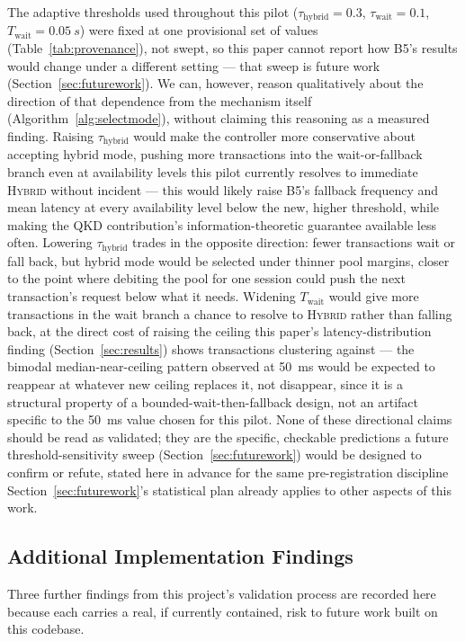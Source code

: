 \documentclass[journal]{IEEEtran}
\begin{document}
The adaptive thresholds used throughout this pilot ($\tau_{\text{hybrid}}=0.3$, $\tau_{\text{wait}}=0.1$, $T_{\text{wait}}=\qty{0.05}{s}$) were fixed at one provisional set of values (Table~\ref{tab:provenance}), not swept, so this paper cannot report how B5's results would change under a different setting --- that sweep is future work (Section~\ref{sec:futurework}). We can, however, reason qualitatively about the direction of that dependence from the mechanism itself (Algorithm~\ref{alg:selectmode}), without claiming this reasoning as a measured finding. Raising $\tau_{\text{hybrid}}$ would make the controller more conservative about accepting hybrid mode, pushing more transactions into the wait-or-fallback branch even at availability levels this pilot currently resolves to immediate \textsc{Hybrid} without incident --- this would likely raise B5's fallback frequency and mean latency at every availability level below the new, higher threshold, while making the QKD contribution's information-theoretic guarantee available less often. Lowering $\tau_{\text{hybrid}}$ trades in the opposite direction: fewer transactions wait or fall back, but hybrid mode would be selected under thinner pool margins, closer to the point where debiting the pool for one session could push the next transaction's request below what it needs. Widening $T_{\text{wait}}$ would give more transactions in the wait branch a chance to resolve to \textsc{Hybrid} rather than falling back, at the direct cost of raising the ceiling this paper's latency-distribution finding (Section~\ref{sec:results}) shows transactions clustering against --- the bimodal median-near-ceiling pattern observed at \qty{50}{ms} would be expected to reappear at whatever new ceiling replaces it, not disappear, since it is a structural property of a bounded-wait-then-fallback design, not an artifact specific to the \qty{50}{ms} value chosen for this pilot. None of these directional claims should be read as validated; they are the specific, checkable predictions a future threshold-sensitivity sweep (Section~\ref{sec:futurework}) would be designed to confirm or refute, stated here in advance for the same pre-registration discipline Section~\ref{sec:futurework}'s statistical plan already applies to other aspects of this work.

\subsection{Additional Implementation Findings}

Three further findings from this project's validation process are recorded here because each carries a real, if currently contained, risk to future work built on this codebase.
\end{document}
